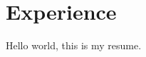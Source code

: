 \documentclass{article}
\begin{document}
\section{Experience}
Hello world, this is my resume.
\end{document}
